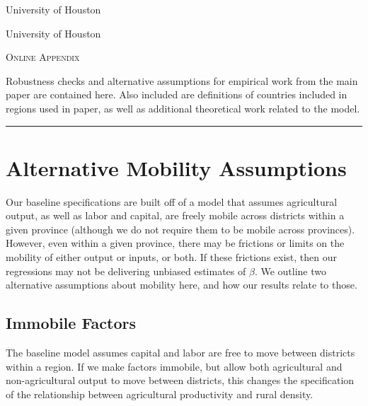 \documentclass[11pt]{article}
\begin{document}
\begin{titlepage}
\vspace{2in} \noindent {\large \today}

\vspace{.5in} 

\vspace{.25in} 

\vspace{.05in} \noindent University of Houston

\vspace{.25in} 

\vspace{.05in} \noindent University of Houston

\vspace{2in} \noindent \textsc{Online Appendix} \hrulefill

\vspace{.05in} \noindent Robustness checks and alternative assumptions for empirical work from the main paper are contained here. Also included are definitions of countries included in regions used in paper, as well as additional theoretical work related to the model.
\vspace{.1in} \hrule

\end{titlepage}

\pagebreak 

\tableofcontents

\section{Alternative Mobility Assumptions}
Our baseline specifications are built off of a model that assumes agricultural output, as well as labor and capital, are freely mobile across districts within a given province (although we do not require them to be mobile across provinces). However, even within a given province, there may be frictions or limits on the mobility of either output or inputs, or both. If these frictions exist, then our regressions may not be delivering unbiased estimates of $\beta$. We outline two alternative assumptions about mobility here, and how our results relate to those. 

\subsection{Immobile Factors}
The baseline model assumes capital and labor are free to move between districts within a region. If we make factors immobile, but allow both agricultural and non-agricultural output to move between districts, this changes the specification of the relationship between agricultural productivity and rural density. 
\end{document}
